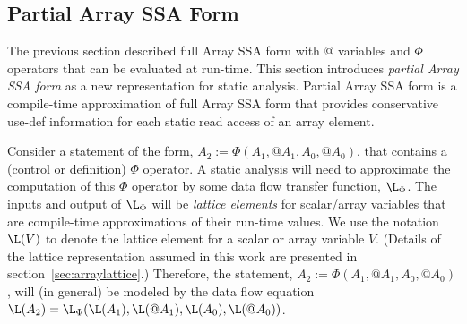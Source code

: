 \subsection{Partial Array SSA Form}\label{sec:partial}

The previous section described full Array SSA form with @ variables
and $\Phi$ operators that can be evaluated at run-time.
This section introduces {\it partial Array SSA form}
as a new representation for static analysis.  Partial Array SSA form 
is a compile-time approximation of full Array SSA form that provides
conservative use-def information for each static
read access of an array element.



Consider a statement of the form, $A_2 := \Phi(A_1, @A_1, A_0, @A_0)$,
that contains a (control or definition) $\Phi$ operator.
A static analysis will need to 
approximate
the computation of this $\Phi$ operator by 
some data flow transfer function, $\L_{\Phi}$.
The inputs and output of $\L_{\Phi}$ will be
{\it lattice elements} for scalar/array variables that
are compile-time approximations of their run-time values.
We use the notation $\L(V)$ to denote the lattice element for 
a scalar or array
variable $V$.
(Details of the lattice representation assumed in this work
are presented in section~\ref{sec:arraylattice}.)
Therefore, the 
statement, $A_2 := \Phi(A_1, @A_1, A_0, @A_0)$, will (in general)
be modeled by the data flow equation 
$\L(A_2) = \L_{\Phi}(\L(A_1), \L(@A_1), \L(A_0), \L(@A_0))$.

